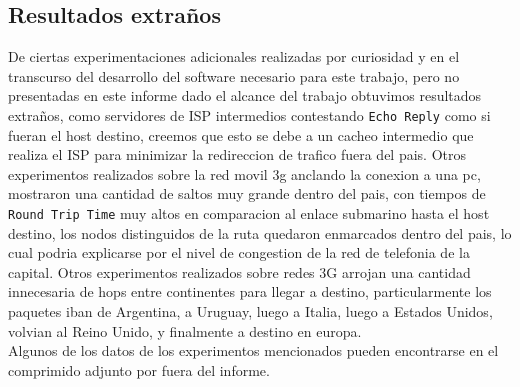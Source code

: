 \subsection{Resultados extraños}
De ciertas experimentaciones adicionales realizadas por curiosidad y en el transcurso del desarrollo del software necesario para este trabajo, pero no presentadas en este informe dado el alcance del trabajo obtuvimos resultados extraños, como servidores de ISP intermedios contestando \texttt{Echo Reply} como si fueran el host destino, creemos que esto se debe a un cacheo intermedio que realiza el ISP para minimizar la redireccion de trafico fuera del pais. Otros experimentos realizados sobre la red movil 3g anclando la conexion a una pc, mostraron una cantidad de saltos muy grande dentro del pais, con tiempos de \texttt{Round Trip Time} muy altos en comparacion al enlace submarino hasta el host destino, los nodos distinguidos de la ruta quedaron enmarcados dentro del pais, lo cual podria explicarse por el nivel de congestion de la red de telefonia de la capital. Otros experimentos realizados sobre redes 3G arrojan una cantidad innecesaria de hops entre continentes para llegar a destino, particularmente los paquetes iban de Argentina, a Uruguay, luego a Italia, luego a Estados Unidos, volvian al Reino Unido, y finalmente a destino en europa.\\
Algunos de los datos de los experimentos mencionados pueden encontrarse en el comprimido adjunto por fuera del informe.